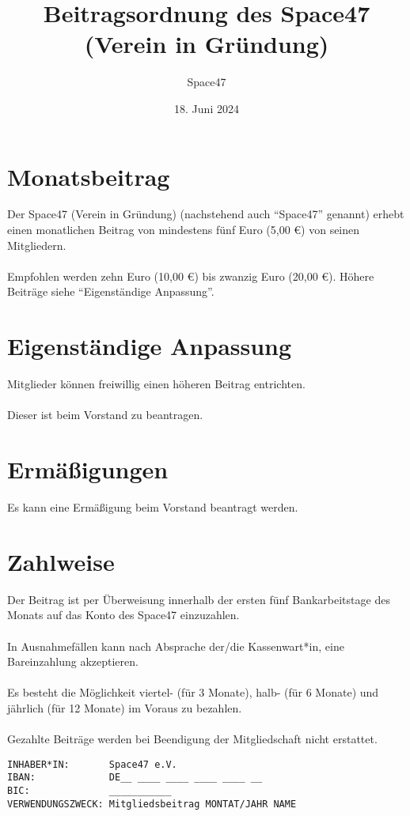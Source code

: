 \documentclass[a4paper]{article}
\title{Beitragsordnung des Space47 (Verein in Gründung)}
\author{Space47}
\date{18. Juni 2024}
\begin{document}
\maketitle

\section{Monatsbeitrag}
Der Space47 (Verein in Gründung) (nachstehend auch “Space47” genannt) erhebt einen monatlichen Beitrag von mindestens fünf Euro (5,00 €) von seinen Mitgliedern. \\ \\
Empfohlen werden zehn Euro (10,00 €) bis zwanzig Euro (20,00 €). Höhere Beiträge siehe \enquote{Eigenständige Anpassung}.

\section{Eigenständige Anpassung}
Mitglieder können freiwillig einen höheren Beitrag entrichten. \\ \\
Dieser ist beim Vorstand zu beantragen.

\section{Ermäßigungen}
Es kann eine Ermäßigung beim Vorstand beantragt werden.

\section{Zahlweise}

Der Beitrag ist per Überweisung innerhalb der ersten fünf Bankarbeitstage des Monats auf das Konto des Space47 einzuzahlen. \\ \\
In Ausnahmefällen kann nach Absprache der/die Kassenwart*in, eine Bareinzahlung akzeptieren. \\ \\
Es besteht die Möglichkeit viertel- (für 3 Monate), halb- (für 6 Monate) und jährlich (für 12 Monate) im Voraus zu bezahlen. \\ \\
Gezahlte Beiträge werden bei Beendigung der Mitgliedschaft nicht erstattet.

\begin{verbatim}
INHABER*IN:       Space47 e.V.
IBAN:             DE__ ____ ____ ____ ____ __
BIC:              ___________
VERWENDUNGSZWECK: Mitgliedsbeitrag MONTAT/JAHR NAME
\end{verbatim}
\end{document}

